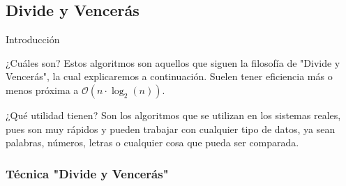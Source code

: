 \documentclass[compress]{beamer}
\begin{document}
\subsection{Divide y Vencerás}

\begin{frame}{Introducción}
	\begin{block}{¿Cuáles son?}
	Estos algoritmos son aquellos que siguen la filosofía de "Divide y Vencerás", la cual explicaremos a continuación. Suelen tener eficiencia más o menos próxima a $\mathcal{O}(n\cdot\log_2(n))$.
	\end{block}
\vspace{0.20in}
	\begin{block}{¿Qué utilidad tienen?}
	Son los algoritmos que se utilizan en los sistemas reales, pues son muy rápidos y pueden trabajar con cualquier tipo de datos, ya sean palabras, números, letras o cualquier cosa que pueda ser comparada.
	\end{block}
\end{frame}

\subsubsection{Técnica "Divide y Vencerás"}
\end{document}
